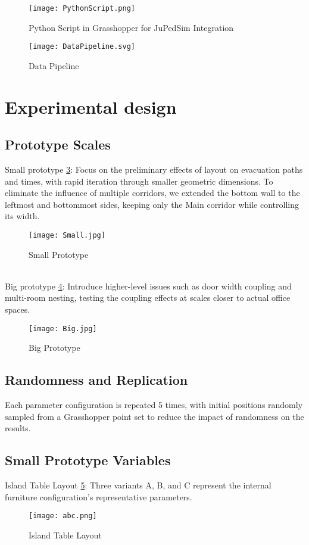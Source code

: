 \begin{figure}[h]
    \centering
    \texttt{[image: PythonScript.png]}
    \caption{Python Script in Grasshopper for JuPedSim Integration}
    \label{fig:pythonscript}
\end{figure}

\begin{figure}[h]
    \centering
    \texttt{[image: DataPipeline.svg]}
    \caption{Data Pipeline}
    \label{fig:pipeline}
\end{figure}

\section{Experimental design}

\subsection{Prototype Scales}
Small prototype \ref{fig:small}: Focus on the preliminary effects of layout on evacuation paths and times, with rapid iteration through smaller geometric dimensions. To eliminate the influence of multiple corridors, we extended the bottom wall to the leftmost and bottommost sides, keeping only the Main corridor while controlling its width.
\begin{figure}[h]
    \centering
    \texttt{[image: Small.jpg]}
    \caption{Small Prototype}
    \label{fig:small}
\end{figure}
\\Big prototype \ref{fig:big}: Introduce higher-level issues such as door width coupling and multi-room nesting, testing the coupling effects at scales closer to actual office spaces.
\begin{figure}[h]
    \centering
    \texttt{[image: Big.jpg]}
    \caption{Big Prototype}
    \label{fig:big}
\end{figure}

\subsection{Randomness and Replication}
Each parameter configuration is repeated 5 times, with initial positions randomly sampled from a Grasshopper point set to reduce the impact of randomness on the results.

\subsection{Small Prototype Variables}
Island Table Layout \ref{fig:abc}: Three variants A, B, and C represent the internal furniture configuration's representative parameters.
\begin{figure}[h]
    \centering
    \texttt{[image: abc.png]}
    \caption{Island Table Layout}
    \label{fig:abc}
\end{figure}

